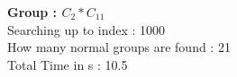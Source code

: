 \textbf{Group : $C_2*C_{11}$}\\
Searching up to index : 1000\\
How many normal groups are found : 21\\
Total Time in s : 10.5\\

